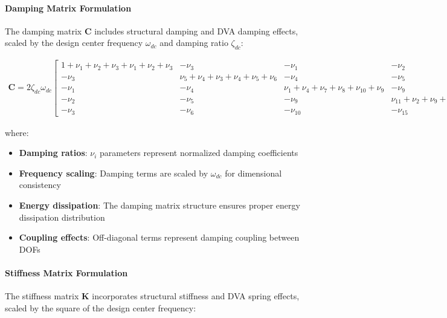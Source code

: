 \documentclass[12pt,a4paper]{article}
\begin{document}
\paragraph{Damping Matrix Formulation}

The damping matrix $\mathbf{C}$ includes structural damping and DVA damping effects, scaled by the design center frequency $\omega_{dc}$ and damping ratio $\zeta_{dc}$:

\begin{align}\label{Eq.damping.matrix.2dof3dof}
    \mathbf{C} = 2\zeta_{dc}\omega_{dc} \begin{bmatrix}
        1 + \nu_1 + \nu_2 + \nu_3 + \nu_1 + \nu_2 + \nu_3 & -\nu_3 & -\nu_1 & -\nu_2 & -\nu_3 \\
        -\nu_3 & \nu_5 + \nu_4 + \nu_3 + \nu_4 + \nu_5 + \nu_6 & -\nu_4 & -\nu_5 & -\nu_6 \\
        -\nu_1 & -\nu_4 & \nu_1 + \nu_4 + \nu_7 + \nu_8 + \nu_{10} + \nu_9 & -\nu_9 & -\nu_{10} \\
        -\nu_2 & -\nu_5 & -\nu_9 & \nu_{11} + \nu_2 + \nu_9 + \nu_{12} + \nu_5 + \nu_{15} & -\nu_{15} \\
        -\nu_3 & -\nu_6 & -\nu_{10} & -\nu_{15} & \nu_{14} + \nu_6 + \nu_{13} + \nu_3 + \nu_{15} + \nu_{10}
    \end{bmatrix}
\end{align}

where:
\begin{itemize}
    \item \textbf{Damping ratios}: $\nu_i$ parameters represent normalized damping coefficients
    \item \textbf{Frequency scaling}: Damping terms are scaled by $\omega_{dc}$ for dimensional consistency
    \item \textbf{Energy dissipation}: The damping matrix structure ensures proper energy dissipation distribution
    \item \textbf{Coupling effects}: Off-diagonal terms represent damping coupling between DOFs
\end{itemize}

\paragraph{Stiffness Matrix Formulation}

The stiffness matrix $\mathbf{K}$ incorporates structural stiffness and DVA spring effects, scaled by the square of the design center frequency:
\end{document}
